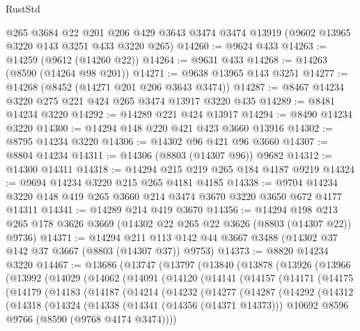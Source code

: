 \begin{lexlean}{RustStd}
\begin{coremodule}
    @265
    @3684
    @22
    @201
    @206
    @429
    @3643
    @3474
    @3474
    @13919
    (@9602 @13965 @3220 @143 @3251 @433 @3220 @265)
@14260 := @9624 @433
@14263 := @14259 (@9612 (@14260 @22))
@14264 := @9631 @433
@14268 := @14263 (@8590 (@14264 @98 @201))
@14271 := @9638 @13965 @143 @3251
@14277 := @14268 (@8452 (@14271 @201 @206 @3643 @3474))
@14287 := @8467 @14234 @3220 @275 @221 @424 @265 @3474 @13917 @3220 @435
@14289 := @8481 @14234 @3220
@14292 := @14289 @221 @424 @13917
@14294 := @8490 @14234 @3220
@14300 := @14294 @148 @220 @421 @423 @3660 @13916
@14302 := @8795 @14234 @3220
@14306 := @14302 @96 @421 @96 @3660
@14307 := @8804 @14234
@14311 := @14306 (@8803 (@14307 @96)) @9682
@14312 := @14300 @14311
@14318 := @14294 @215 @219 @265 @184 @4187 @9219
@14324 := @9694 @14234 @3220 @215 @265 @4181 @4185
@14338 := @9704 @14234 @3220 @148 @419 @265 @3660 @214 @3474 @3670 @3220 @3650 @672 @4177 @14311
@14341 := @14289 @214 @419 @3670
@14356 := @14294
    @198
    @213
    @265
    @178
    @3626
    @3669
    (@14302 @22 @265 @22 @3626 (@8803 (@14307 @22)) @9736)
@14371 := @14294
    @211
    @113
    @142
    @44
    @3667
    @3488
    (@14302 @37 @142 @37 @3667 (@8803 (@14307 @37)) @9753)
@14373 := @8820 @14234 @3220
@14467 := @13686
    (@13747
      (@13797
        (@13840
          (@13878
            (@13926
              (@13966
                (@13992
                  (@14029
                    (@14062
                      (@14091
                        (@14120
                          (@14141
                            (@14157
                              (@14171
                                (@14175
                                  (@14179
                                    (@14183
                                      (@14187
                                        (@14214
                                          (@14232
                                            (@14277
                                              (@14287
                                                (@14292
                                                  (@14312
                                                    (@14318
                                                      (@14324
                                                        (@14338
                                                          (@14341 (@14356 (@14371 @14373)))
                                                          @10692
                                                          @8596
                                                          @9766
                                                          (@8590 (@9768 @4174 @3474))))

\end{coremodule}
\end{lexlean}
